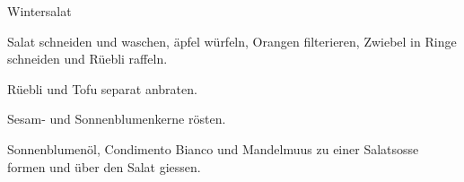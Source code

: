 
\begin{recipe}[]{Wintersalat}{}{}




\step%
Salat schneiden und waschen, \"apfel w\"urfeln, Orangen filterieren, Zwiebel
in Ringe schneiden und R\"uebli raffeln.

\step%
R\"uebli und Tofu separat anbraten.

\step%
Sesam- und Sonnenblumenkerne r\"osten.


\step%
Sonnenblumen\"ol, Condimento Bianco und Mandelmuus zu einer Salatsosse formen
und \"uber den Salat giessen.


\end{recipe}
